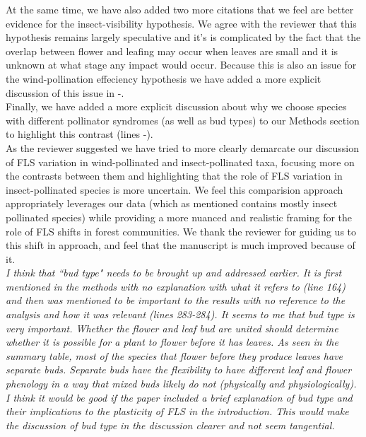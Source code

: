 \documentclass[11pt]{article}
\begin{document}
At the same time, we have also added two more citations that we feel are better evidence for the insect-visibility hypothesis. We agree with the reviewer that this hypothesis remains largely speculative and it's is complicated by the fact that the overlap between flower and leafing may occur when leaves are small and it is unknown at what stage any impact would occur. Because this is also an issue for the wind-pollination effeciency hypothesis we have added a more explicit discussion of this issue in -.\\

Finally, we have added a more explicit discussion about why we choose species with different pollinator syndromes (as well as bud types) to our Methods section to highlight this contrast (lines \lineref{}-\lineref{}).\\

As the reviewer suggested we have tried to more clearly demarcate our discussion of FLS variation in wind-pollinated and insect-pollinated taxa, focusing more on the contrasts between them and highlighting that the role of FLS variation in insect-pollinated species is more uncertain. We feel this comparision approach appropriately leverages our data (which as mentioned contains mostly insect pollinated species) while providing a more nuanced and realistic framing for the role of FLS shifts in forest communities. We thank the reviewer for guiding us to this shift in approach, and feel that the manuscript is much improved because of it.\\

\emph{I think that ``bud type" needs to be brought up and addressed earlier. It is first mentioned in the methods with no explanation with what it refers to (line 164) and then was mentioned to be important to the results with no reference to the analysis and how it was relevant (lines 283-284). It seems to me that bud type is very important. Whether the flower and leaf bud are united should determine whether it is possible for a plant to flower before it has leaves.  As seen in the summary table, most of the species that flower before they produce leaves have separate buds. Separate buds have the flexibility to have different leaf and flower phenology in a way that mixed buds likely do not (physically and physiologically). I think it would be good if the paper included a brief explanation of bud type and their implications to the plasticity of FLS in the introduction. This would make the discussion of bud type in the discussion clearer and not seem tangential.}\\
\end{document}
